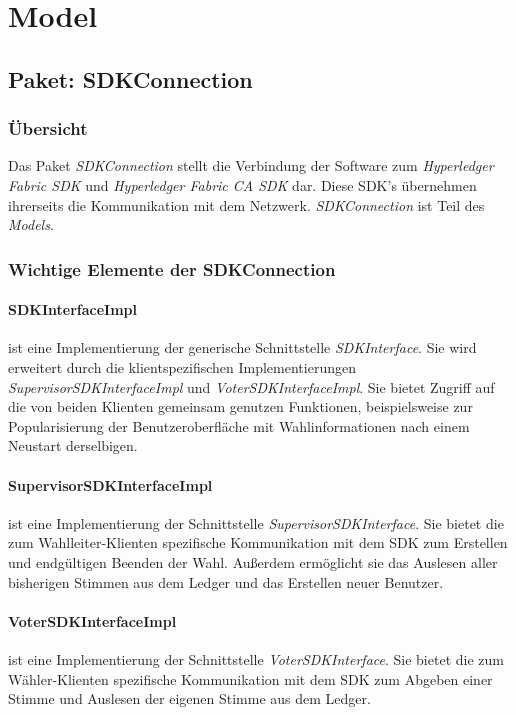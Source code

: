 \documentclass[parskip=full]{scrartcl}
\begin{document}
	\newpage
	\section{Model}
	\subsection{Paket: SDKConnection}
	\subsubsection{Übersicht}
	Das Paket \textit{SDKConnection} stellt die Verbindung der Software zum \textit{Hyperledger Fabric SDK} und \textit{Hyperledger Fabric CA SDK} dar. Diese SDK's übernehmen ihrerseits die Kommunikation mit dem Netzwerk. \textit{SDKConnection} ist Teil des \textit{Models}.
	\subsubsection{Wichtige Elemente der SDKConnection}
	\paragraph{SDKInterfaceImpl} ist eine Implementierung der generische Schnittstelle \textit{SDKInterface}. Sie wird erweitert durch die klientspezifischen Implementierungen \textit{SupervisorSDKInterfaceImpl} und \textit{VoterSDKInterfaceImpl}. Sie bietet Zugriff auf die von beiden Klienten gemeinsam genutzen Funktionen, beispielsweise zur Popularisierung der Benutzeroberfläche mit Wahlinformationen nach einem Neustart derselbigen.
	\paragraph{SupervisorSDKInterfaceImpl} ist eine Implementierung der Schnittstelle \textit{SupervisorSDKInterface}. Sie bietet die zum Wahlleiter-Klienten spezifische Kommunikation mit dem SDK zum Erstellen und endgültigen Beenden der Wahl. Außerdem ermöglicht sie das Auslesen aller bisherigen Stimmen aus dem Ledger und das Erstellen neuer Benutzer.
	\paragraph{VoterSDKInterfaceImpl} ist eine Implementierung der Schnittstelle \textit{VoterSDKInterface}. Sie bietet die zum Wähler-Klienten spezifische Kommunikation mit dem SDK zum Abgeben einer Stimme und Auslesen der eigenen Stimme aus dem Ledger.
\end{document}
